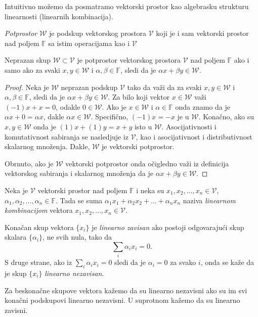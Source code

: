 \documentclass{article}
\begin{document}
Intuitivno možemo da posmatramo vektorski prostor kao algebrasku strukturu linearnosti (linearnih kombinacija).

\begin{definition}
  \textit{Potprostor} $\mathcal{W}$ je podskup vektorskog prostora $\mathcal{V}$ koji je i sam vektorski prostor nad poljem $\mathbb{F}$ sa istim operacijama kao i $\mathcal{V}$
\end{definition}

\begin{theorem}
  Neprazan skup $\mathcal{W} \subset \mathcal{V}$ je potprostor vektorskog prostora $\mathcal{V}$ nad poljem $\mathbb{F}$ ako i samo ako za svaki $x, y \in \mathcal{W}$ i $\alpha, \beta \in \mathbb{F}$, sledi da je $\alpha x + \beta y \in \mathcal{W}$.
\end{theorem}

\begin{proof}
  Neka je $\mathcal{W}$ neprazan podskup $\mathcal{V}$ tako da važi da za svaki $x, y \in \mathcal{W}$ i $\alpha, \beta \in \mathbb{F}$, sledi da je $\alpha x + \beta y \in \mathcal{W}$.
  Za bilo koji vektor $x \in \mathcal{W}$ važi $(-1) x + x = 0$, odakle $0 \in \mathcal{W}$.
  Ako je $x \in \mathcal{W}$ i $\alpha \in \mathbb{F}$ onda znamo da je $\alpha x + 0 = \alpha x$, dakle $\alpha x \in \mathcal{W}$.
  Specifično, $(-1) x = -x$ je u $\mathcal{W}$.
  Konačno, ako su $x, y \in \mathcal{W}$ onda je $(1) x + (1) y = x + y$ isto u $\mathcal{W}$.
  Asocijativnosti i komutativnost sabiranja se nasledjuje iz $\mathcal{V}$, kao i asocijativnost i distributivnost skalarnog množenja.
  Dakle, $\mathcal{W}$ je vektorski potprostor.

  Obrnuto, ako je $\mathcal{W}$ vektorski potprostor onda očigledno važi iz definicija vektorskog sabiranja i skalarnog množenja da je $\alpha x + \beta y \in \mathcal{W}$.
\end{proof}

\begin{definition}
  Neka je $\mathcal{V}$ vektorski prostor nad poljem $\mathbb{F}$ i neka su $x_1, x_2, \ldots, x_n \in \mathcal{V}$, $\alpha_1, \alpha_2, \ldots, \alpha_n \in \mathbb{F}$.
  Tada se suma $\alpha_1 x_1 + \alpha_2 x_2 + \ldots + \alpha_n x_n$ naziva \textit{linearnom kombinacijom} vektora $x_1, x_2, \ldots, x_n \in \mathcal{V}$.
\end{definition}

\begin{definition}
  Konačan skup vektora $\{x_i\}$ je \textit{linearno zavisan} ako postoji odgovarajući skup skalara $\{\alpha_i\}$, ne svih nula, tako da
  \[\sum_{i} \alpha_i x_i = 0.\]
  S druge strane, ako iz $\sum_{i} \alpha_i x_i = 0$ sledi da je $\alpha_i = 0$ za svako $i$, onda se kaže da je skup $\{x_i\}$ \textit{linearno nezavisan}.
  
  Za beskonačne skupove vektora kažemo da su linearno nezavisni ako su im svi konačni podskupovi linearno nezavisni.
  U suprotnom kažemo da su linearno zavisni.
\end{definition}
\end{document}
